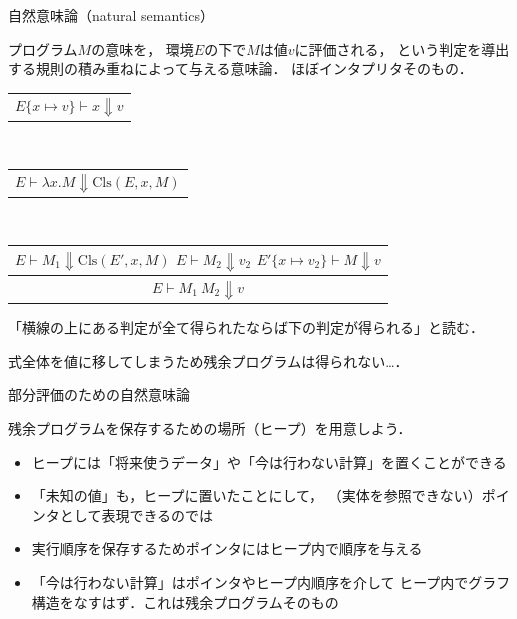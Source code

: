 \documentclass[aspectratio=169,t,dvipdfmx,12pt]{beamer}
\newcommand\infer[2]{\begin{tabular}{c}#1\relax\\\hline#2\end{tabular}}
\begin{document}
\begin{frame}{自然意味論（natural semantics）}

プログラム$M$の意味を，
環境$E$の下で$M$は値$v$に評価される，
という判定を導出する規則の積み重ねによって与える意味論．
ほぼインタプリタそのもの．

\begin{tabbing}
\qquad\infer{}{$E\{x\mapsto v\} \vdash x \Downarrow v$}
\\[10pt]
\qquad\infer{}{$E \vdash \lambda x. M \Downarrow \mathrm{Cls}(E,x,M)$}
\\[18pt]
\qquad\infer
{$E \vdash M_1 \Downarrow \mathrm{Cls}(E',x,M)$\qquad
 $E \vdash M_2 \Downarrow v_2$\qquad
 $E'\{x\mapsto v_2\} \vdash M \Downarrow v$}
{$E \vdash M_1\ M_2 \Downarrow v$}
\end{tabbing}

\bigskip

「横線の上にある判定が全て得られたならば下の判定が得られる」と読む．

\medskip

式全体を値に移してしまうため残余プログラムは得られない…．

\end{frame}

\begin{frame}{部分評価のための自然意味論}

残余プログラムを保存するための場所（ヒープ）を用意しよう．

\begin{itemize}
\item ヒープには「将来使うデータ」や「今は行わない計算」を置くことができる
\item 「未知の値」も，ヒープに置いたことにして，
（実体を参照できない）ポインタとして表現できるのでは
\item 実行順序を保存するためポインタにはヒープ内で順序を与える
\item 「今は行わない計算」はポインタやヒープ内順序を介して
ヒープ内でグラフ構造をなすはず．これは残余プログラムそのもの
\end{itemize}

\end{frame}
\end{document}
